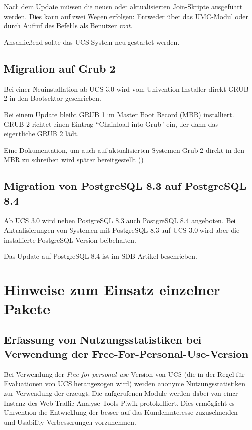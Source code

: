 Nach dem Update müssen die neuen oder aktualisierten Join-Skripte
ausgeführt werden. Dies kann auf zwei Wegen erfolgen: Entweder über
das UMC-Modul  oder durch Aufruf des
Befehls  als
Benutzer \emph{root}.

Anschließend sollte das UCS-System neu gestartet werden.

\section{Migration auf Grub 2}

Bei einer Neuinstallation ab UCS 3.0 wird vom Univention Installer direkt GRUB 2 in den
Bootsektor geschrieben.

Bei einem Update bleibt GRUB 1 im Master Boot Record (MBR) installiert. GRUB 2
richtet einen Eintrag ``Chainload into Grub'' ein, der dann das eigentliche
GRUB 2 lädt.

Eine Dokumentation, um auch auf aktualisierten Systemen Grub 2 direkt
in den MBR zu schreiben wird später bereitgestellt ().

\section{Migration von PostgreSQL 8.3 auf PostgreSQL 8.4}
Ab UCS 3.0 wird neben PostgreSQL 8.3 auch PostgreSQL 8.4
angeboten. Bei Aktualisierungen von Systemen mit PostgreSQL 8.3 auf
UCS 3.0 wird aber die installierte PostgreSQL Version beibehalten.

Das Update auf PostgreSQL 8.4 ist im
SDB-Artikel  beschrieben.

\chapter{Hinweise zum Einsatz einzelner Pakete}

\section{Erfassung von Nutzungsstatistiken bei Verwendung der Free-For-Personal-Use-Version}
Bei Verwendung der  \emph{Free for personal use}-Version
von UCS (die in der Regel für Evaluationen von UCS herangezogen wird)
werden anonyme Nutzungsstatistiken zur Verwendung der \ucsUMC{}
erzeugt. Die aufgerufenen Module werden dabei von einer Instanz des
Web-Traffic-Analyse-Tools Piwik protokolliert. Dies ermöglicht es
Univention die Entwicklung der \ucsUMC{} besser auf das
Kundeninteresse zuzuschneiden und Usability-Verbesserungen vorzunehmen.

